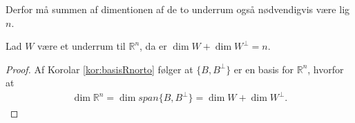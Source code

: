 Derfor må summen af dimentionen af de to underrum også nødvendigvis være lig $n$.
\begin{kor}
Lad $W$ være et underrum til $\mathds{R}^n$, da er $\dim {W} + \dim {W^{\bot}} = n$.
\end{kor}
\begin{proof}
Af Korolar \ref{kor:basisRnorto} følger at $\{B, B^{\bot}\}$ er en basis for $\mathds{R}^n$, hvorfor at
\begin{align}
\dim{\mathds{R}^n} = \dim{span\{B, B^{\bot}\}} = \dim{W} + \dim{W^{\bot}}.
\end{align}
\end{proof}
 

 